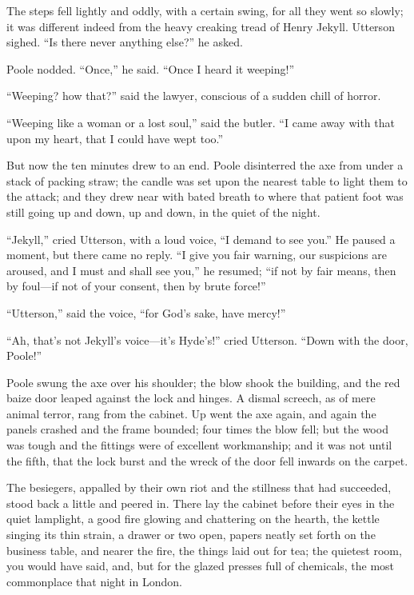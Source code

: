 \documentclass[12pt,openright]{book}
\begin{document}
The steps fell lightly and oddly, with a certain swing, for all they went so slowly; it was different indeed from the heavy creaking tread of Henry Jekyll. Utterson sighed. “Is there never anything else?” he asked.

Poole nodded. “Once,” he said. “Once I heard it weeping!”

“Weeping? how that?” said the lawyer, conscious of a sudden chill of horror.

“Weeping like a woman or a lost soul,” said the butler. “I came away with that upon my heart, that I could have wept too.”

But now the ten minutes drew to an end. Poole disinterred the axe from under a stack of packing straw; the candle was set upon the nearest table to light them to the attack; and they drew near with bated breath to where that patient foot was still going up and down, up and down, in the quiet of the night.

“Jekyll,” cried Utterson, with a loud voice, “I demand to see you.” He paused a moment, but there came no reply. “I give you fair warning, our suspicions are aroused, and I must and shall see you,” he resumed; “if not by fair means, then by foul—if not of your consent, then by brute force!”

“Utterson,” said the voice, “for God’s sake, have mercy!”

“Ah, that’s not Jekyll’s voice—it’s Hyde’s!” cried Utterson. “Down with the door, Poole!”

Poole swung the axe over his shoulder; the blow shook the building, and the red baize door leaped against the lock and hinges. A dismal screech, as of mere animal terror, rang from the cabinet. Up went the axe again, and again the panels crashed and the frame bounded; four times the blow fell; but the wood was tough and the fittings were of excellent workmanship; and it was not until the fifth, that the lock burst and the wreck of the door fell inwards on the carpet.

The besiegers, appalled by their own riot and the stillness that had succeeded, stood back a little and peered in. There lay the cabinet before their eyes in the quiet lamplight, a good fire glowing and chattering on the hearth, the kettle singing its thin strain, a drawer or two open, papers neatly set forth on the business table, and nearer the fire, the things laid out for tea; the quietest room, you would have said, and, but for the glazed presses full of chemicals, the most commonplace that night in London.
\end{document}
